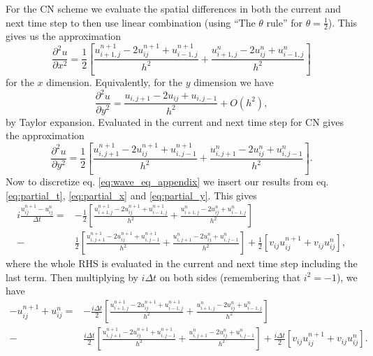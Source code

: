 \documentclass[english,notitlepage,reprint,nofootinbib]{revtex4-1}  %
\begin{document}
For the CN scheme we evaluate the spatial differences in both the current and next time step to then use linear combination (using ``The $\theta$ rule'' \cite{compendium} for $\theta = \frac{1}{2}$). This gives us the approximation
\begin{equation}
    \frac{\partial^2 u}{\partial x^2} = \frac{1}{2} \left[ \frac{u_{i+1,j}^{n+1} -2u_{ij}^{n+1} + u_{i-1,j}^{n+1}}{h^2}
    + \frac{u_{i+1,j}^{n} -2u_{ij}^{n} + u_{i-1,j}^{n}}{h^2} \right] \label{eq:partial_x}
\end{equation}
for the $x$ dimension. Equivalently, for the $y$ dimension we have
\begin{equation}
    \frac{\partial^2 u}{\partial y^2} = \frac{u_{i,j+1} -2u_{ij} + u_{i,j-1}}{h^2} + O(h^2),
\end{equation}
by Taylor expansion. Evaluated in the current and next time step for CN gives the approximation
\begin{equation}
    \frac{\partial^2 u}{\partial y^2} = \frac{1}{2} \left[ \frac{u_{i,j+1}^{n+1} -2u_{ij}^{n+1} + u_{i,j-1}^{n+1}}{h^2}
    + \frac{u_{i,j+1}^{n} -2u_{ij}^{n} + u_{i,j-1}^{n}}{h^2} \right]. \label{eq:partial_y}
\end{equation}
Now to discretize eq. \ref{eq:wave_eq_appendix} we insert our results from eq. \ref{eq:partial_t}, \ref{eq:partial_x} and \ref{eq:partial_y}. This gives
\begin{align}
    i \frac{u_{ij}^{n+1} - u_{ij}^n}{\Delta t}
    = & - \frac{1}{2} \left[ \frac{u_{i+1,j}^{n+1} -2u_{ij}^{n+1} + u_{i-1,j}^{n+1}}{h^2}
    + \frac{u_{i+1,j}^{n} -2u_{ij}^{n} + u_{i-1,j}^{n}}{h^2} \right]                       \nonumber \\
    - & \frac{1}{2} \left[ \frac{u_{i,j+1}^{n+1} -2u_{ij}^{n+1} + u_{i,j-1}^{n+1}}{h^2}
    + \frac{u_{i,j+1}^{n} -2u_{ij}^{n} + u_{i,j-1}^{n}}{h^2} \right]
    + \frac{1}{2} \left[ v_{ij}u_{ij}^{n+1} + v_{ij}u_{ij}^n \right],
\end{align}
where the whole RHS is evaluated in the current and next time step including the last term. Then multiplying by $i\Delta t$ on both sides (remembering that $i^2 = -1$), we have
\begin{align}
    - u_{ij}^{n+1} + u_{ij}^n
    = & - \frac{i\Delta t}{2} \left[ \frac{u_{i+1,j}^{n+1} -2u_{ij}^{n+1} + u_{i-1,j}^{n+1}}{h^2}
    + \frac{u_{i+1,j}^{n} -2u_{ij}^{n} + u_{i-1,j}^{n}}{h^2} \right]                              \nonumber \\
    - & \frac{i\Delta t}{2} \left[ \frac{u_{i,j+1}^{n+1} -2u_{ij}^{n+1} + u_{i,j-1}^{n+1}}{h^2}
    + \frac{u_{i,j+1}^{n} -2u_{ij}^{n} + u_{i,j-1}^{n}}{h^2} \right]
    + \frac{i\Delta t}{2} \left[ v_{ij}u_{ij}^{n+1} + v_{ij}u_{ij}^n \right].
\end{align}
\end{document}
